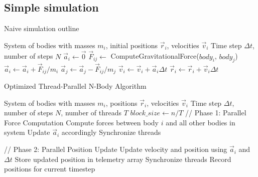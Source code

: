 \documentclass{article}
\begin{document}
\subsection{Simple simulation}
\begin{algorithm}[H]
    \caption{Naive simulation outline}\label{alg:cap}
    \begin{algorithmic}
        \Require System of bodies with masses $m_i$, initial positions $\vec{r}_i$, velocities $\vec{v}_i$
        \Require Time step $\Delta t$, number of steps $N$
                \State $\vec{a}_i \gets \vec{0}$ 
            \EndFor
                    \State $\vec{F}_{ij} \gets$ ComputeGravitationalForce($body_i$, $body_j$)
                    \State $\vec{a}_i \gets \vec{a}_i + \vec{F}_{ij}/m_i$
                    \State $\vec{a}_j \gets \vec{a}_j - \vec{F}_{ij}/m_j$
                \EndFor
            \EndFor
                \State $\vec{v}_i \gets \vec{v}_i + \vec{a}_i\Delta t$ 
                \State $\vec{r}_i \gets \vec{r}_i + \vec{v}_i\Delta t$ 
            \EndFor
        \EndFor
    \end{algorithmic}
\end{algorithm}

\begin{algorithm}[H]
    \caption{Optimized Thread-Parallel N-Body Algorithm}\label{alg:optimized}
    \begin{algorithmic}[0]
        \Require System of bodies with masses $m_i$, positions $\vec{r}_i$, velocities $\vec{v}_i$
        \Require Time step $\Delta t$, number of steps $N$, number of threads $T$
        \State $block\_size \gets n/T$ 
            \State // Phase 1: Parallel Force Computation
                    \State Compute forces between body $i$ and all other bodies in system
                    \State Update $\vec{a}_i$ accordingly
                \EndFor
            \EndFor
            \State Synchronize threads
            
            \State // Phase 2: Parallel Position Update
                    \State Update velocity and position using $\vec{a}_i$ and $\Delta t$
                    \State Store updated position in telemetry array
                \EndFor
            \EndFor
            \State Synchronize threads
            \State Record positions for current timestep
        \EndFor
    \end{algorithmic}
\end{algorithm}
\end{document}

